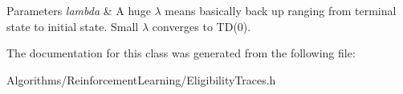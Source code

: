 \begin{DoxyParams}{Parameters}
{\em lambda} & A huge $\lambda$ means basically back up ranging from terminal state to initial state. Small $\lambda$ converges to T\+D(0). \\
\hline
\end{DoxyParams}


The documentation for this class was generated from the following file\+:\begin{DoxyCompactItemize}
\item 
Algorithms/\+Reinforcement\+Learning/Eligibility\+Traces.\+h\end{DoxyCompactItemize}
